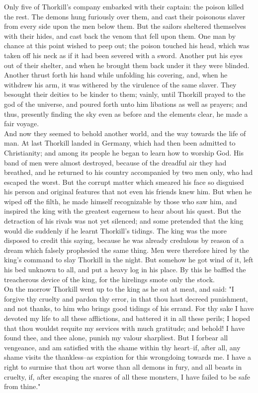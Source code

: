 \documentclass[10pt,a4paper]{report}
\begin{document}
Only five of Thorkill's company embarked with their captain: the poison killed the rest. The demons hung furiously over them, and cast their poisonous slaver from every side upon the men below them. But the sailors sheltered themselves with their hides, and cast back the venom that fell upon them. One man by chance at this point wished to peep out; the poison touched his head, which was taken off his neck as if it had been severed with a sword. Another put his eyes out of their shelter, and when he brought them back under it they were blinded. Another thrust forth his hand while unfolding his covering, and, when he withdrew his arm, it was withered by the virulence of the same slaver. They besought their deities to be kinder to them; vainly, until Thorkill prayed to the god of the universe, and poured forth unto him libations as well as prayers; and thus, presently finding the sky even as before and the elements clear, he made a fair voyage.\\

And now they seemed to behold another world, and the way towards the life of man. At last Thorkill landed in Germany, which had then been admitted to Christianity; and among its people he began to learn how to worship God. His band of men were almost destroyed, because of the dreadful air they had breathed, and he returned to his country accompanied by two men only, who had escaped the worst. But the corrupt matter which smeared his face so disguised his person and original features that not even his friends knew him. But when he wiped off the filth, he made himself recognizable by those who saw him, and inspired the king with the greatest eagerness to hear about his quest. But the detraction of his rivals was not yet silenced; and some pretended that the king would die suddenly if he learnt Thorkill's tidings. The king was the more disposed to credit this saying, because he was already credulous by reason of a dream which falsely prophesied the same thing. Men were therefore hired by the king's command to slay Thorkill in the night. But somehow he got wind of it, left his bed unknown to all, and put a heavy log in his place. By this he baffled the treacherous device of the king, for the hirelings smote only the stock.\\

On the morrow Thorkill went up to the king as he sat at meat, and said: "I forgive thy cruelty and pardon thy error, in that thou hast decreed punishment, and not thanks, to him who brings good tidings of his errand. For thy sake I have devoted my life to all these afflictions, and battered it in all these perils; I hoped that thou wouldst requite my services with much gratitude; and behold! I have found thee, and thee alone, punish my valour sharpliest. But I forbear all vengeance, and am satisfied with the shame within thy heart--if, after all, any shame visits the thankless--as expiation for this wrongdoing towards me. I have a right to surmise that thou art worse than all demons in fury, and all beasts in cruelty, if, after escaping the snares of all these monsters, I have failed to be safe from thine."\\
\end{document}
